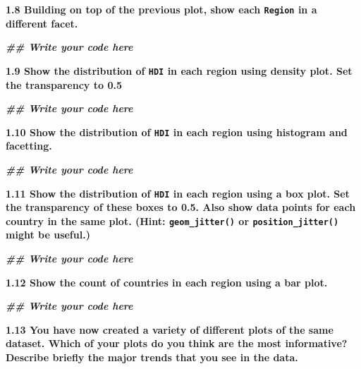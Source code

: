 \documentclass[
]{article}
\newenvironment{Shaded}{\begin{snugshade}}{\end{snugshade}}
\newcommand{\DocumentationTok}[1]{\textcolor[rgb]{0.56,0.35,0.01}{\textbf{\textit{#1}}}}
\begin{document}
\textbf{1.8 Building on top of the previous plot, show each
\texttt{Region} in a different facet.}

\begin{Shaded}
\begin{Highlighting}[]
\DocumentationTok{\#\# Write your code here}
\end{Highlighting}
\end{Shaded}

\textbf{1.9 Show the distribution of \texttt{HDI} in each region using
density plot. Set the transparency to 0.5}

\begin{Shaded}
\begin{Highlighting}[]
\DocumentationTok{\#\# Write your code here}
\end{Highlighting}
\end{Shaded}

\textbf{1.10 Show the distribution of \texttt{HDI} in each region using
histogram and facetting.}

\begin{Shaded}
\begin{Highlighting}[]
\DocumentationTok{\#\# Write your code here}
\end{Highlighting}
\end{Shaded}

\textbf{1.11 Show the distribution of \texttt{HDI} in each region using
a box plot. Set the transparency of these boxes to 0.5. Also show data
points for each country in the same plot. (Hint: \texttt{geom\_jitter()}
or \texttt{position\_jitter()} might be useful.)}

\begin{Shaded}
\begin{Highlighting}[]
\DocumentationTok{\#\# Write your code here}
\end{Highlighting}
\end{Shaded}

\textbf{1.12 Show the count of countries in each region using a bar
plot.}

\begin{Shaded}
\begin{Highlighting}[]
\DocumentationTok{\#\# Write your code here}
\end{Highlighting}
\end{Shaded}

\textbf{1.13 You have now created a variety of different plots of the
same dataset. Which of your plots do you think are the most informative?
Describe briefly the major trends that you see in the data.}
\end{document}

